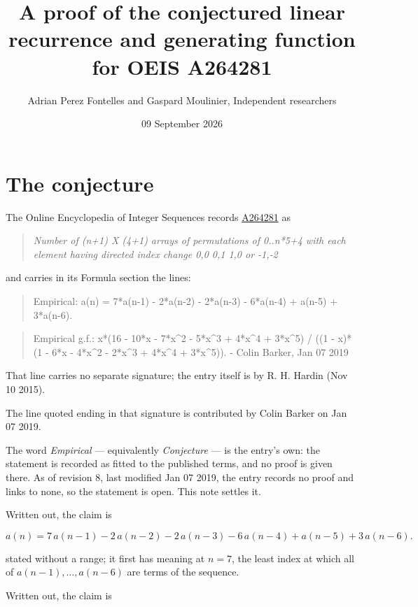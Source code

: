 \documentclass[11pt]{article}
\title{A proof of the conjectured linear recurrence and generating function for OEIS A264281}
\author{Adrian Perez Fontelles and Gaspard Moulinier, Independent researchers}
\date{09 September 2026}
\theoremstyle{definition}
\begin{document}
\maketitle
\section{The conjecture}

The Online Encyclopedia of Integer Sequences records \href{https://oeis.org/A264281}{A264281} as

\begin{quote}\itshape Number of (n+1) X (4+1) arrays of permutations of 0..n*5+4 with each element having directed index change 0,0 0,1 1,0 or -1,-2\end{quote}

and carries in its Formula section the lines:

\begin{quote}\ttfamily Empirical: a(n) = 7*a(n-1) - 2*a(n-2) - 2*a(n-3) - 6*a(n-4) + a(n-5) + 3*a(n-6).\end{quote}

\begin{quote}\ttfamily Empirical g.f.: x*(16 - 10*x - 7*x\textasciicircum{}2 - 5*x\textasciicircum{}3 + 4*x\textasciicircum{}4 + 3*x\textasciicircum{}5) / ((1 - x)*(1 - 6*x - 4*x\textasciicircum{}2 - 2*x\textasciicircum{}3 + 4*x\textasciicircum{}4 + 3*x\textasciicircum{}5)). - Colin Barker, Jan 07 2019\end{quote}

That line carries no separate signature; the entry itself is by R. H. Hardin (Nov 10 2015).

The line quoted ending in that signature is contributed by Colin Barker on Jan 07 2019.

The word {\itshape Empirical} --- equivalently {\itshape Conjecture} --- is the entry's own: the statement is recorded as fitted to the published terms, and no proof is given there. As of revision 8, last modified Jan 07 2019, the entry records no proof and links to none, so the statement is open. This note settles it.

Written out, the claim is

\[a(n) = 7\,a(n-1) - 2\,a(n-2) - 2\,a(n-3) - 6\,a(n-4) + a(n-5) + 3\,a(n-6).\]

stated without a range; it first has meaning at $n = 7$, the least index at which all of $a(n-1),\dots,a(n-6)$ are terms of the sequence.

Written out, the claim is
\end{document}
